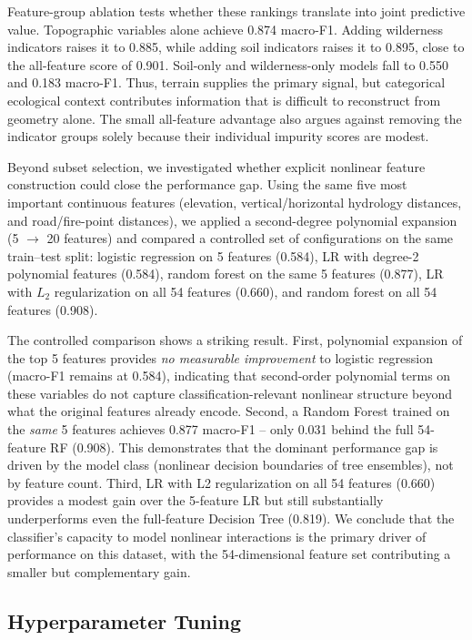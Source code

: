 \documentclass{article}
\begin{document}
Feature-group ablation tests whether these rankings translate into joint predictive value. Topographic variables alone achieve 0.874 macro-F1. Adding wilderness indicators raises it to 0.885, while adding soil indicators raises it to 0.895, close to the all-feature score of 0.901. Soil-only and wilderness-only models fall to 0.550 and 0.183 macro-F1. Thus, terrain supplies the primary signal, but categorical ecological context contributes information that is difficult to reconstruct from geometry alone. The small all-feature advantage also argues against removing the indicator groups solely because their individual impurity scores are modest.

Beyond subset selection, we investigated whether explicit nonlinear feature construction could close the performance gap.  Using the same five most important continuous features (elevation, vertical/horizontal hydrology distances, and road/fire-point distances), we applied a second-degree polynomial expansion (5 $\to$ 20 features) and compared a controlled set of configurations on the same train--test split: logistic regression on 5 features (0.584), LR with degree-2 polynomial features (0.584), random forest on the same 5 features (0.877), LR with $L_2$ regularization on all 54 features (0.660), and random forest on all 54 features (0.908).

The controlled comparison shows a striking result.  First, polynomial expansion of the top 5 features provides \emph{no measurable improvement} to logistic regression (macro-F1 remains at 0.584), indicating that second-order polynomial terms on these variables do not capture classification-relevant nonlinear structure beyond what the original features already encode.  Second, a Random Forest trained on the \emph{same} 5 features achieves 0.877 macro-F1 -- only 0.031 behind the full 54-feature RF (0.908).  This demonstrates that the dominant performance gap is driven by the model class (nonlinear decision boundaries of tree ensembles), not by feature count.  Third, LR with L2 regularization on all 54 features (0.660) provides a modest gain over the 5-feature LR but still substantially underperforms even the full-feature Decision Tree (0.819).  We conclude that the classifier's capacity to model nonlinear interactions is the primary driver of performance on this dataset, with the 54-dimensional feature set contributing a smaller but complementary gain.

\FloatBarrier
\subsection{Hyperparameter Tuning}
\label{sec:tuning}
\end{document}
